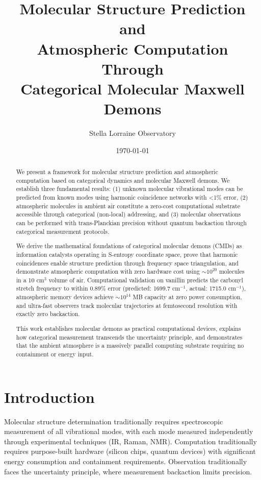 \documentclass[11pt]{article}
\title{Molecular Structure Prediction and\\
Atmospheric Computation Through\\
Categorical Molecular Maxwell Demons}
\author{Stella Lorraine Observatory}
\date{\today}
\begin{document}
\maketitle

\begin{abstract}
We present a framework for molecular structure prediction and atmospheric computation based on categorical dynamics and molecular Maxwell demons. We establish three fundamental results: (1) unknown molecular vibrational modes can be predicted from known modes using harmonic coincidence networks with <1\% error, (2) atmospheric molecules in ambient air constitute a zero-cost computational substrate accessible through categorical (non-local) addressing, and (3) molecular observations can be performed with trans-Planckian precision without quantum backaction through categorical measurement protocols.

We derive the mathematical foundations of categorical molecular demons (CMDs) as information catalysts operating in S-entropy coordinate space, prove that harmonic coincidences enable structure prediction through frequency space triangulation, and demonstrate atmospheric computation with zero hardware cost using $\sim$$10^{20}$ molecules in a 10 cm$^3$ volume of air. Computational validation on vanillin predicts the carbonyl stretch frequency to within 0.89\% error (predicted: 1699.7 cm$^{-1}$, actual: 1715.0 cm$^{-1}$), atmospheric memory devices achieve $\sim$$10^{14}$ MB capacity at zero power consumption, and ultra-fast observers track molecular trajectories at femtosecond resolution with exactly zero backaction.

This work establishes molecular demons as practical computational devices, explains how categorical measurement transcends the uncertainty principle, and demonstrates that the ambient atmosphere is a massively parallel computing substrate requiring no containment or energy input.
\end{abstract}

\tableofcontents

\section{Introduction}

Molecular structure determination traditionally requires spectroscopic measurement of all vibrational modes, with each mode measured independently through experimental techniques (IR, Raman, NMR). Computation traditionally requires purpose-built hardware (silicon chips, quantum devices) with significant energy consumption and containment requirements. Observation traditionally faces the uncertainty principle, where measurement backaction limits precision.
\end{document}

